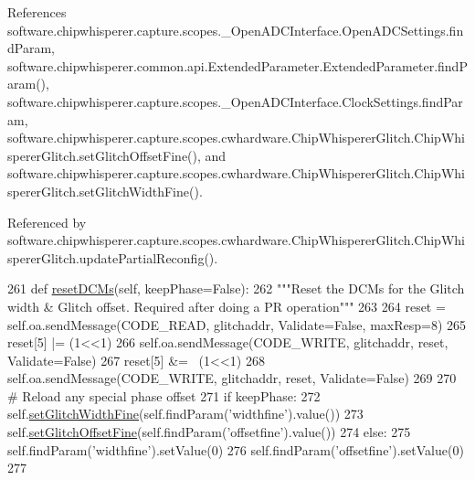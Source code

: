 References software.\+chipwhisperer.\+capture.\+scopes.\+\_\+\+Open\+A\+D\+C\+Interface.\+Open\+A\+D\+C\+Settings.\+find\+Param, software.\+chipwhisperer.\+common.\+api.\+Extended\+Parameter.\+Extended\+Parameter.\+find\+Param(), software.\+chipwhisperer.\+capture.\+scopes.\+\_\+\+Open\+A\+D\+C\+Interface.\+Clock\+Settings.\+find\+Param, software.\+chipwhisperer.\+capture.\+scopes.\+cwhardware.\+Chip\+Whisperer\+Glitch.\+Chip\+Whisperer\+Glitch.\+set\+Glitch\+Offset\+Fine(), and software.\+chipwhisperer.\+capture.\+scopes.\+cwhardware.\+Chip\+Whisperer\+Glitch.\+Chip\+Whisperer\+Glitch.\+set\+Glitch\+Width\+Fine().



Referenced by software.\+chipwhisperer.\+capture.\+scopes.\+cwhardware.\+Chip\+Whisperer\+Glitch.\+Chip\+Whisperer\+Glitch.\+update\+Partial\+Reconfig().


\begin{DoxyCode}
261     \textcolor{keyword}{def }\hyperlink{classsoftware_1_1chipwhisperer_1_1capture_1_1scopes_1_1cwhardware_1_1ChipWhispererGlitch_1_1ChipWhispererGlitch_ab099f869f5a55e0adc66c9372c47c1ef}{resetDCMs}(self, keepPhase=False):
262         \textcolor{stringliteral}{"""Reset the DCMs for the Glitch width & Glitch offset. Required after doing a PR operation"""}
263 
264         reset = self.oa.sendMessage(CODE\_READ, glitchaddr, Validate=\textcolor{keyword}{False}, maxResp=8)
265         reset[5] |= (1<<1)
266         self.oa.sendMessage(CODE\_WRITE, glitchaddr, reset, Validate=\textcolor{keyword}{False})
267         reset[5] &= ~(1<<1)
268         self.oa.sendMessage(CODE\_WRITE, glitchaddr, reset, Validate=\textcolor{keyword}{False})
269 
270         \textcolor{comment}{# Reload any special phase offset}
271         \textcolor{keywordflow}{if} keepPhase:
272             self.\hyperlink{classsoftware_1_1chipwhisperer_1_1capture_1_1scopes_1_1cwhardware_1_1ChipWhispererGlitch_1_1ChipWhispererGlitch_a794020f16b1325179dfbce70be5efb75}{setGlitchWidthFine}(self.findParam(\textcolor{stringliteral}{'widthfine'}).value())
273             self.\hyperlink{classsoftware_1_1chipwhisperer_1_1capture_1_1scopes_1_1cwhardware_1_1ChipWhispererGlitch_1_1ChipWhispererGlitch_aed5e35a69be48dac4d567cd01210ed9f}{setGlitchOffsetFine}(self.findParam(\textcolor{stringliteral}{'offsetfine'}).value())
274         \textcolor{keywordflow}{else}:
275             self.findParam(\textcolor{stringliteral}{'widthfine'}).setValue(0)
276             self.findParam(\textcolor{stringliteral}{'offsetfine'}).setValue(0)
277 
\end{DoxyCode}
\hypertarget{classsoftware_1_1chipwhisperer_1_1capture_1_1scopes_1_1cwhardware_1_1ChipWhispererGlitch_1_1ChipWhispererGlitch_a8f0e74e8edd47e12856e4c8d60cf8d7b}{}
